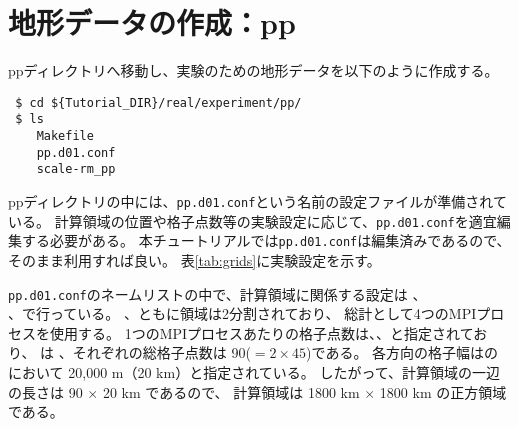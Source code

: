 \section{地形データの作成：pp} \label{sec:tutrial_real_pp}

ppディレクトリへ移動し、実験のための地形データを以下のように作成する。
\begin{verbatim}
 $ cd ${Tutorial_DIR}/real/experiment/pp/
 $ ls
    Makefile
    pp.d01.conf
    scale-rm_pp
\end{verbatim}
ppディレクトリの中には、\verb|pp.d01.conf|という名前の設定ファイルが準備されている。
計算領域の位置や格子点数等の実験設定に応じて、\verb|pp.d01.conf|を適宜編集する必要がある。
本チュートリアルでは\verb|pp.d01.conf|は編集済みであるので、そのまま利用すれば良い。
表\ref{tab:grids}に実験設定を示す。

\verb|pp.d01.conf|のネームリストの中で、計算領域に関係する設定は 、\\
、で行っている。
{\XDIR} 、{\YDIR}ともに領域は2分割されており、
総計として4つのMPIプロセスを使用する。
1つのMPIプロセスあたりの格子点数は、、と指定されており、
は{\XDIR} 、{\YDIR}それぞれの総格子点数は 90($=2 \times 45$)である。
各方向の格子幅はのにおいて 20,000 m（20 km）と指定されている。
したがって、計算領域の一辺の長さは 90 $\times$ 20 km であるので、
計算領域は 1800 km $\times$ 1800 km の正方領域である。


